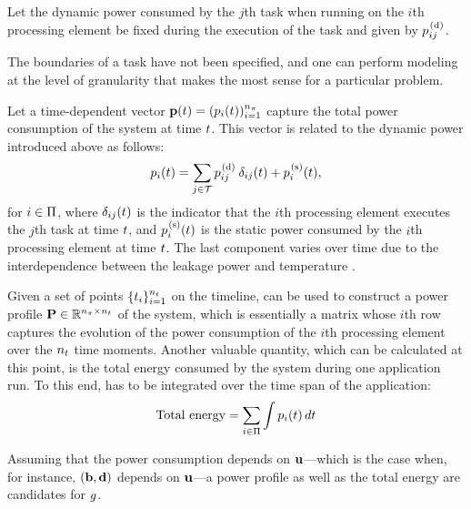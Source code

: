 Let the dynamic power consumed by the $j$th task when running on the $i$th
processing element be fixed during the execution of the task and given by
$p^{\text{\kern0.1em(d)}}_{ij}$.

\begin{remark}
The boundaries of a task have not been specified, and one can perform modeling
at the level of granularity that makes the most sense for a particular problem.
\end{remark}

Let a time-dependent vector $\mathbf{p}(t) = (p_i(t))_{i = 1}^{{n_\pi}}$ capture the
total power consumption of the system at time $t$. This vector is related to
the dynamic power introduced above as follows:
\begin{equation} \elab{power}
  \p_i(\t) = \sum_{j \in \tasks} \p^\dynamic_{ij} \: \delta_{ij} (\t) + \p^\static_i(\t),
\end{equation}
for $i \in \Pi$, where $\delta_{ij}(t)$ is the indicator that the $i$th
processing element executes the $j$th task at time $t$, and $p^{\text{\kern0.1em(s)}}_i(t)$
is the static power consumed by the $i$th processing element at time $t$. The
last component varies over time due to the interdependence between the leakage
power and temperature \cite{liu2007}.

Given a set of points $\{ t_i \}_{i = 1}^{n_t}$ on the timeline,  can
be used to construct a power profile $\mathbf{P} \in \mathbb{R}^{{n_\pi} \times {n_t}}$ of the
system, which is essentially a matrix whose $i$th row captures the evolution of
the power consumption of the $i$th processing element over the ${n_t}$ time
moments. Another valuable quantity, which can be calculated at this point, is
the total energy consumed by the system during one application run. To this end,
 has to be integrated over the time span of the application:
\begin{equation} \elab{total-energy}
  \text{Total energy} = \sum_{i \in \procs} \int \p_i(\t) \, d\t
\end{equation}

Assuming that the power consumption depends on $\mathbf{u}$---which is the case when,
for instance, $(\mathbf{b}, \mathbf{d})$ depends on $\mathbf{u}$---a power profile as well as the
total energy are candidates for $g$.
